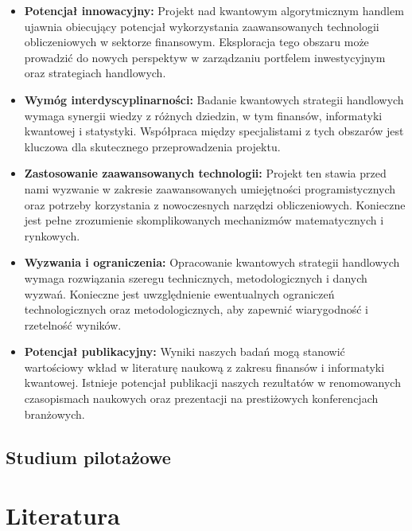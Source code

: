 \documentclass[polish,envcountsect,10pt]{article}
\begin{document}
\begin{itemize}
    \item \textbf{Potencjał innowacyjny:} Projekt nad kwantowym algorytmicznym handlem ujawnia obiecujący potencjał wykorzystania zaawansowanych technologii obliczeniowych w sektorze finansowym. Eksploracja tego obszaru może prowadzić do nowych perspektyw w zarządzaniu portfelem inwestycyjnym oraz strategiach handlowych.
    
    \item \textbf{Wymóg interdyscyplinarności:} Badanie kwantowych strategii handlowych wymaga synergii wiedzy z różnych dziedzin, w tym finansów, informatyki kwantowej i statystyki. Współpraca między specjalistami z tych obszarów jest kluczowa dla skutecznego przeprowadzenia projektu.
    
    \item \textbf{Zastosowanie zaawansowanych technologii:} Projekt ten stawia przed nami wyzwanie w zakresie zaawansowanych umiejętności programistycznych oraz potrzeby korzystania z nowoczesnych narzędzi obliczeniowych. Konieczne jest pełne zrozumienie skomplikowanych mechanizmów matematycznych i rynkowych.
    
    \item \textbf{Wyzwania i ograniczenia:} Opracowanie kwantowych strategii handlowych wymaga rozwiązania szeregu technicznych, metodologicznych i danych wyzwań. Konieczne jest uwzględnienie ewentualnych ograniczeń technologicznych oraz metodologicznych, aby zapewnić wiarygodność i rzetelność wyników.
    
    \item \textbf{Potencjał publikacyjny:} Wyniki naszych badań mogą stanowić wartościowy wkład w literaturę naukową z zakresu finansów i informatyki kwantowej. Istnieje potencjał publikacji naszych rezultatów w renomowanych czasopismach naukowych oraz prezentacji na prestiżowych konferencjach branżowych.
\end{itemize}

\subsection{Studium pilotażowe}


\section{Literatura}
\end{document}

